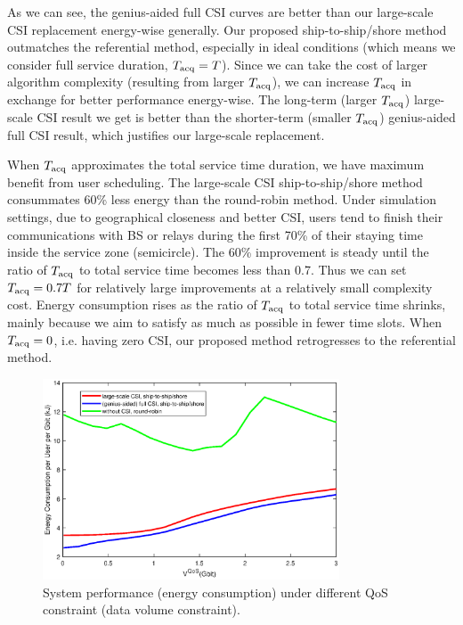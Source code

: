 \documentclass[conference]{IEEEtran}
\begin{document}
 As we can see, the genius-aided full CSI curves are better than our large-scale CSI replacement energy-wise generally. Our proposed ship-to-ship/shore method outmatches the referential method, especially in ideal conditions (which means we consider full service duration, ${T_{\rm{acq}}}=T$). 
 Since we can take the cost of larger algorithm complexity (resulting from larger $T_{\rm{acq}}$), we can increase  $T_{\rm{acq}}$ in exchange for better performance energy-wise. The long-term (larger $T_{\rm{acq}}$) large-scale CSI result we get is better than the shorter-term (smaller $T_{\rm{acq}}$) genius-aided full CSI result, which justifies our large-scale replacement. 
 
 When ${T_{\rm{acq}}}$ approximates the total service time duration, we have maximum benefit from user scheduling. The large-scale CSI ship-to-ship/shore method consummates 60\% less energy than the round-robin method. 
 Under simulation settings, due to geographical closeness and better CSI, users tend to finish their communications with BS or relays during the first 70\% of their staying time inside the service zone (semicircle). The 60\% improvement is steady until the ratio of ${T_{\rm{acq}}}$ to total service time becomes less than 0.7. Thus we can set ${T_{\rm{acq}}=0.7T}$ for relatively large improvements at a relatively small complexity cost. 
 Energy consumption rises as the ratio of ${T_{\rm{acq}}}$ to total service time shrinks, mainly because we aim to satisfy as much as possible in fewer time slots. When ${T_{\rm{acq}}} = 0$, i.e. having zero CSI, our proposed method retrogresses to the referential method. 
 
 
 
 \begin{figure} [htb]
 \begin{center}
 \includegraphics*[width=8.8cm]{Cqos.eps}
 \end{center}
 \vspace*{-4mm} 
 \caption{System performance (energy consumption) under different QoS constraint (data volume constraint).}\label{fig:3}
 \vspace*{-2mm} 
 \end{figure}
 
\end{document}
